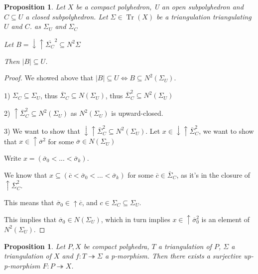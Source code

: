 \documentclass[12pt]{article}
\DeclareMathOperator{\Tr}{Tr}
\newtheorem{proposition}[theorem]{Proposition}
\numberwithin{equation}{subsection}
\begin{document}
\begin{proposition}
	Let $X$ be a compact polyhedron, U an open subpolyhedron and $C\subseteq U$ a closed subpolyhedron. 
	Let $\Sigma\in \Tr(X)$ be a triangulation triangulating $U$ and $C$. as $\Sigma_U$ and $\Sigma_C$
	
	Let $B=\downarrow\uparrow \overline{\Sigma_C}^2\subseteq N^2\Sigma$
	
	Then $|B|\subseteq U$.
\end{proposition}
\begin{proof}
	We showed above that $|B|\subseteq U\iff B\subseteq N^2(\Sigma_U)$.
	
	1) $\Sigma_C\subseteq \Sigma_U$, thus $\overline\Sigma_C\subseteq N(\Sigma_U)$, thus $\overline\Sigma_C^2\subseteq N^2(\Sigma_U)$
	
	2) $\uparrow \overline\Sigma_C^2\subseteq N^2(\Sigma_U)$ as $N^2(\Sigma_U)$ is upward-closed.
	
	3) We want to show that $\downarrow \uparrow \overline\Sigma_C^2\subseteq N^2(\Sigma_U)$.
		Let $x\in \downarrow\uparrow\overline\Sigma_C^2$, we want to show that $x\in \uparrow \overline\sigma^2$ for some $\overline\sigma\in N(\Sigma_U)$
		
		Write $x=(\overline\sigma_0<...<\overline\sigma_k)$.
		
		We know that $x\subseteq (\overline c<\overline\sigma_0<...<\overline\sigma_k)$ for some $\overline c\in \overline\Sigma_C$, as it's in the closure of $\uparrow\overline\Sigma_C^2$.
		
		This means that $\overline\sigma_0\in \uparrow\overline c$, and $c\in \Sigma_C\subseteq \Sigma_U$.
		
		This implies that $\overline\sigma_0\in N(\Sigma_U)$, which in turn implies $x\in \uparrow \overline\sigma_0^2$  is an element of $N^2(\Sigma_U)$.
\end{proof}
\begin{proposition}
	Let $P, X$ be compact polyhedra, $T$ a triangulation of $P$, $\Sigma$ a triangulation of $X$ and $f:T\twoheadrightarrow\Sigma$ a p-morphism.
	Then there exists a surjective up-p-morphism $F:P\twoheadrightarrow X$.
\end{proposition}
\end{document}
